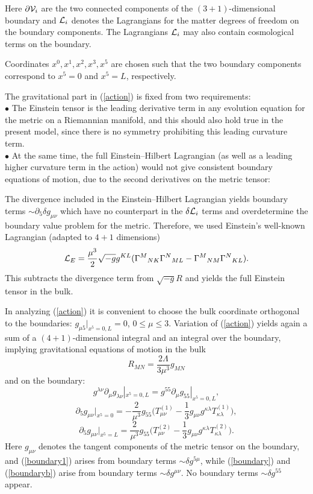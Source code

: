 \documentclass[12pt,fleqn]{article}
\newcommand{\be}{\begin{equation}}
\newcommand{\ee}{\end{equation}}
\begin{document}
Here $\partial{\cal V}_i$ are the
two connected components of the $(3+1)$-dimensional boundary 
and ${\cal L}_i$ denotes
 the Lagrangians for the matter degrees of freedom
on the boundary components.
 The Lagrangians ${\cal L}_i$ may also contain cosmological terms on the boundary.

Coordinates $x^0,x^1,x^2,x^3,x^5$ are chosen such that the two
boundary components correspond to $x^5=0$ and $x^5=L$, respectively.

The gravitational part in (\ref{action}) is fixed from two requirements:\\
$\bullet$ The Einstein tensor is the leading derivative term
in any evolution equation for the metric on a Riemannian
manifold, and this should also hold true in the present model, 
since there is no symmetry prohibiting this leading
curvature term.\\
$\bullet$ At the same time, the full Einstein--Hilbert
Lagrangian (as well as a leading higher curvature term
in the action) would not give consistent boundary equations of
motion, due to the second
derivatives on the metric tensor:

The divergence
included in the Einstein--Hilbert
Lagrangian yields boundary terms $\sim\partial_5\delta g_{\mu\nu}$
which have no counterpart in the $\delta{\cal L}_i$ terms and
overdetermine the boundary value problem for the metric.
Therefore, we used Einstein's well-known
Lagrangian (adapted to $4+1$ dimensions)
\[
{\cal L}_E=\frac{\mu^{3}}{2}\sqrt{-g}g^{KL}
(\Gamma^M{}_{NK}\Gamma^N{}_{ML}-\Gamma^M{}_{NM}\Gamma^N{}_{KL}). 
\]
This subtracts
the divergence term
from $\sqrt{-g}R$ and yields the full
Einstein tensor in the bulk.

In analyzing (\ref{action}) it is convenient
to choose the bulk coordinate orthogonal to the
 boundaries: $g_{\mu 5}|_{x^5=0,L}=0$, $0\le\mu\le 3$.
Variation of (\ref{action}) yields again a sum
of a $(4+1)$-dimensional integral and an integral
over the boundary, implying gravitational
equations of motion in the bulk
\be\label{einstein}
R_{MN}=\frac{2\Lambda}{3\mu^3}g_{MN}
\ee
and on the boundary:
\be\label{boundary1}
g^{\lambda\nu}\partial_\mu g_{\lambda\nu}|_{x^5=0,L}
=g^{55}\partial_\mu g_{55}|_{x^5=0,L},
\ee
\be\label{boundary}
\partial_5 g_{\mu\nu}|_{x^5=0}
=-\frac{2}{\mu^3}g_{55}\Big(T_{\mu\nu}^{(1)}
-\frac{1}{3}g_{\mu\nu}g^{\kappa\lambda}T_{\kappa\lambda}^{(1)}\Big),
\ee
\be\label{boundaryb}
\partial_5 g_{\mu\nu}|_{x^5=L}
=\frac{2}{\mu^3}g_{55}\Big(T_{\mu\nu}^{(2)}
-\frac{1}{3}g_{\mu\nu}g^{\kappa\lambda}T_{\kappa\lambda}^{(2)}\Big).
\ee
Here $g_{\mu\nu}$ denotes the tangent components of the
metric tensor on the boundary, and (\ref{boundary1})
 arises from boundary terms $\sim\delta g^{5\mu}$,
while (\ref{boundary}) and (\ref{boundaryb}) arise from boundary 
terms $\sim\delta g^{\mu\nu}$.
No boundary
terms $\sim\delta g^{55}$ appear. 
\end{document}
